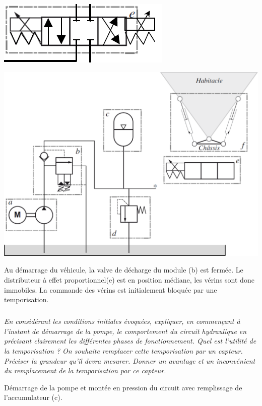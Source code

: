 \documentclass[10pt,fleqn]{article} %
\begin{document}
\begin{multicols}{2}
\ifprof
\begin{corrige}
\begin{center}
\includegraphics[width=.5\linewidth]{images/cor_01}
\end{center}
\end{corrige}
\else\begin{center}
\includegraphics[width=\linewidth]{images/fig_05}
\end{center}

\fi

Au démarrage du véhicule, la valve de décharge du module (b) est fermée. Le distributeur à effet proportionnel(e) est en position médiane, les vérins sont donc immobiles. La commande des vérins est initialement bloquée par une temporisation.

\subparagraph{}\textit{En considérant les conditions initiales évoquées, expliquer, en commençant à l’instant de démarrage de la pompe, le comportement du circuit hydraulique en précisant clairement les différentes phases de fonctionnement. Quel est l’utilité de la temporisation ? On souhaite remplacer cette temporisation par un capteur. Préciser la grandeur qu’il devra mesurer. Donner un avantage et un inconvénient du remplacement de la temporisation par ce capteur.}
\ifprof
\begin{corrige}
Démarrage de la pompe et montée en pression du circuit avec remplissage de l’accumulateur (c).


\end{corrige}
\end{multicols}
\end{document}
